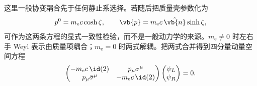 这里一般协变耦合先于任何静止系选择。若随后把质量壳参数化为
\begin{equation}
 p^0=m_{\mathrm e} c\cosh\zeta,
 \qquad
 \vb{p}=m_{\mathrm e} c\,\hat{\vb{n}}\sinh\zeta,
 \label{eq:rapidity-momentum-r7}
\end{equation}
 可作为这两条方程的显式一致性检验，而不是一般动力学的来源。$m_{\mathrm e}\neq0$ 时左右手 Weyl 表示由质量项耦合；$m_{\mathrm e}=0$ 时两式解耦。把两式合并得到四分量动量空间方程
\begin{equation}
 \begin{pmatrix}
 -m_{\mathrm e} c\,\id(2) & p_\mu\sigma^\mu\\
 p_\mu\bar\sigma^\mu & -m_{\mathrm e} c\,\id(2)
 \end{pmatrix}
 \begin{pmatrix}\psi_L\\\psi_R\end{pmatrix}=0.
 \label{eq:weyl-block-first-order-r7}
\end{equation}

